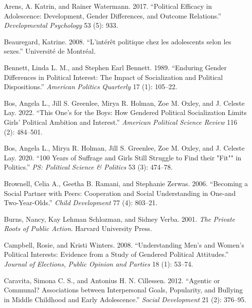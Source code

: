 \documentclass[
  letterpaper,
  DIV=11,
  numbers=noendperiod]{scrreprt}
\newlength{\cslhangindent}
\newlength{\cslentryspacingunit} %
\newenvironment{CSLReferences}[2] %
 {%
  \setlength{\parindent}{0pt}
  \ifodd #1
  \let\oldpar\par
  \def\par{\hangindent=\cslhangindent\oldpar}
  \fi
  \setlength{\parskip}{#2\cslentryspacingunit}
 }%
 {}
\begin{document}
\hypertarget{refs-3}{}
\begin{CSLReferences}{1}{0}
\leavevmode{}%
Arens, A. Katrin, and Rainer Watermann. 2017. {``{Political Efficacy in
Adolescence: Development, Gender Differences, and Outcome Relations}.''}
\emph{Developmental Psychology} 53 (5): 933.

\leavevmode{}%
Beauregard, Katrine. 2008. {``{L'intérêt politique chez les adolescents
selon les sexes}.''} Université de Montréal.

\leavevmode{}%
Bennett, Linda L. M., and Stephen Earl Bennett. 1989. {``{Enduring
Gender Differences in Political Interest: The Impact of Socialization
and Political Dispositions}.''} \emph{American Politics Quarterly} 17
(1): 105--22.

\leavevmode{}%
Bos, Angela L., Jill S. Greenlee, Mirya R. Holman, Zoe M. Oxley, and J.
Celeste Lay. 2022. {``This One's for the Boys: How Gendered Political
Socialization Limits Girls' Political Ambition and Interest.''}
\emph{American Political Science Review} 116 (2): 484--501.

\leavevmode{}%
Bos, Angela L., Mirya R. Holman, Jill S. Greenlee, Zoe M. Oxley, and J.
Celeste Lay. 2020. {``{100 Years of Suffrage and Girls Still Struggle to
Find their "Fit"" in Politics}.''} \emph{PS: Political Science \&
Politics} 53 (3): 474--78.

\leavevmode{}%
Brownell, Celia A., Geetha B. Ramani, and Stephanie Zerwas. 2006.
{``{Becoming a Social Partner with Peers: Cooperation and Social
Understanding in One-and Two-Year-Olds}.''} \emph{Child Development} 77
(4): 803--21.

\leavevmode{}%
Burns, Nancy, Kay Lehman Schlozman, and Sidney Verba. 2001. \emph{{The
Private Roots of Public Action}}. Harvard University Press.

\leavevmode{}%
Campbell, Rosie, and Kristi Winters. 2008. {``{Understanding Men's and
Women's Political Interests: Evidence from a Study of Gendered Political
Attitudes}.''} \emph{Journal of Elections, Public Opinion and Parties}
18 (1): 53--74.

\leavevmode{}%
Caravita, Simona C. S., and Antonius H. N. Cillessen. 2012. {``{Agentic
or Communal? Associations between Interpersonal Goals, Popularity, and
Bullying in Middle Childhood and Early Adolescence}.''} \emph{Social
Development} 21 (2): 376--95.


\end{CSLReferences}
\end{document}
